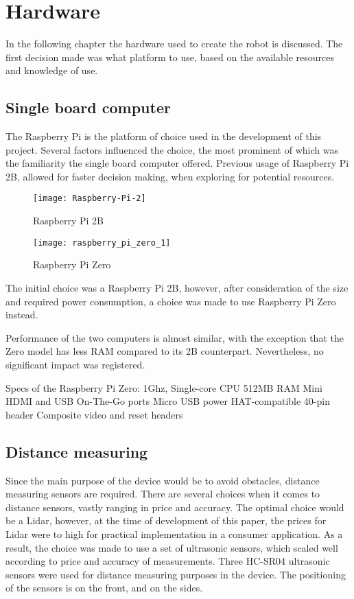 \chapter{Hardware}\label{ch:hardware}


In the following chapter the hardware used to create the robot is discussed.
The first decision made was what platform to use, based on the available resources and knowledge of use.

\section{Single board computer} 

The Raspberry Pi is the platform of choice used in the development of this project. Several factors influenced the choice, the most prominent of which was the familiarity the single board computer offered. Previous usage of Raspberry Pi 2B, allowed for faster decision making, when exploring for potential resources. 

\begin{figure}[h]
\centering
\texttt{[image: Raspberry-Pi-2]}
\caption{Raspberry Pi 2B}
\label{fig::rasppi2b}
\end{figure}

\begin{figure}[h]
\centering
\texttt{[image: raspberry\_pi\_zero\_1]}
\caption{Raspberry Pi Zero}
\label{fig::raspizero}
\end{figure}

The initial choice was a Raspberry Pi 2B, however, after consideration of the size and required power consumption, a choice was made to use Raspberry Pi Zero instead.  

Performance of the two computers is almost similar, with the exception that the Zero model has less RAM compared to its 2B counterpart. Nevertheless, no significant impact was registered.

Specs of the Raspberry Pi Zero:
1Ghz, Single-core CPU
512MB RAM
Mini HDMI and USB On-The-Go ports
Micro USB power
HAT-compatible 40-pin header
Composite video and reset headers

\section{Distance measuring} 

Since the main purpose of the device would be to avoid obstacles, distance measuring sensors are required. There are several choices when it comes to distance sensors, vastly ranging in price and accuracy. The optimal choice would be a Lidar, however, at the time of development of this paper, the prices for Lidar were to high for practical implementation in a consumer application. 
As a result, the choice was made to use a set of ultrasonic sensors, which scaled well according to price and accuracy of measurements.
Three HC-SR04 ultrasonic sensors were used for distance measuring purposes in the device. The positioning of the sensors is on the front, and on the sides.

